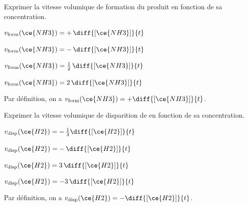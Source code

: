 
\begin{enonce}
	Exprimer la vitesse volumique de formation du produit en fonction de sa concentration.
	\begin{listeQCM2Colonnes}
	\item $v_\text{form}(\ce{NH3}) = + \,\diff{[\ce{NH3}]}{t}$ \smallskip
	\item $v_\text{form}(\ce{NH3}) = - \,\diff{[\ce{NH3}]}{t}$ \smallskip
	\item $v_\text{form}(\ce{NH3}) = \frac{1}{2} \,\diff{[\ce{NH3}]}{t}$ \smallskip
	\item $v_\text{form}(\ce{NH3}) = 2 \,\diff{[\ce{NH3}]}{t}$\\
	\end{listeQCM2Colonnes}
\end{enonce}

\reponse{\reponseA{}}

\begin{corrige}
Par définition, on a $v_\text{form}(\ce{NH3}) = + \diff{[\ce{NH3}]}{t}$.
\end{corrige}




\begin{enonce}
Exprimer la vitesse volumique de disparition de  en fonction de sa concentration.
	\begin{listeQCM2Colonnes}
	\item $v_\text{disp}(\ce{H2}) = - \, \frac{1}{3} \diff{[\ce{H2}]}{t}$ \smallskip
	\item $v_\text{disp}(\ce{H2}) = - \, \diff{[\ce{H2}]}{t}$ \smallskip
	\item $v_\text{disp}(\ce{H2}) = 3 \, \diff{[\ce{H2}]}{t}$ \smallskip
	\item $v_\text{disp}(\ce{H2}) = -3 \, \diff{[\ce{H2}]}{t}$
	\end{listeQCM2Colonnes}
\end{enonce}

\reponse{\reponseB{}}

\begin{corrige}
Par définition, on a $v_\text{disp}(\ce{H2}) = - \diff{[\ce{H2}]}{t}$.
\end{corrige}

